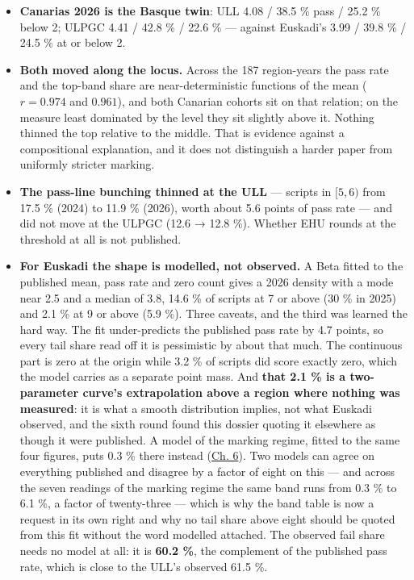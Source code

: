 \documentclass[
  10.5pt,
  a4paper,
  DIV=11,
  numbers=noendperiod]{scrartcl}
\providecommand{\tightlist}{%
  \setlength{\itemsep}{0pt}\setlength{\parskip}{0pt}}
\begin{document}
\begin{itemize}
\tightlist
\item
  \textbf{Canarias 2026 is the Basque twin}: ULL 4.08 / 38.5 \% pass /
  25.2 \% below 2; ULPGC 4.41 / 42.8 \% / 22.6 \% --- against Euskadi's
  3.99 / 39.8 \% / 24.5 \% at or below 2.
\item
  \textbf{Both moved along the locus.} Across the 187 region-years the
  pass rate and the top-band share are near-deterministic functions of
  the mean (\(r = 0.974\) and \(0.961\)), and both Canarian cohorts sit
  on that relation; on the measure least dominated by the level they sit
  slightly above it. Nothing thinned the top relative to the middle.
  That is evidence against a compositional explanation, and it does not
  distinguish a harder paper from uniformly stricter marking.
\item
  \textbf{The pass-line bunching thinned at the ULL} --- scripts in
  \([5,6)\) from 17.5 \% (2024) to 11.9 \% (2026), worth about 5.6
  points of pass rate --- and did not move at the ULPGC (12.6 → 12.8
  \%). Whether EHU rounds at the threshold at all is not published.
\item
  \textbf{For Euskadi the shape is modelled, not observed.} A Beta
  fitted to the published mean, pass rate and zero count gives a 2026
  density with a mode near 2.5 and a median of 3.8, 14.6 \% of scripts
  at 7 or above (30 \% in 2025) and 2.1 \% at 9 or above (5.9 \%). Three
  caveats, and the third was learned the hard way. The fit
  under-predicts the published pass rate by 4.7 points, so every tail
  share read off it is pessimistic by about that much. The continuous
  part is zero at the origin while 3.2 \% of scripts did score exactly
  zero, which the model carries as a separate point mass. And
  \textbf{that 2.1 \% is a two-parameter curve's extrapolation above a
  region where nothing was measured}: it is what a smooth distribution
  implies, not what Euskadi observed, and the sixth round found this
  dossier quoting it elsewhere as though it were published. A model of
  the marking regime, fitted to the same four figures, puts 0.3 \% there
  instead (\href{06-interpretation.qmd\#penalty-shape}{Ch. 6}). Two
  models can agree on everything published and disagree by a factor of
  eight on this --- and across the seven readings of the marking regime
  the same band runs from 0.3 \% to 6.1 \%, a factor of twenty-three ---
  which is why the band table is now a request in its own right and why
  no tail share above eight should be quoted from this fit without the
  word modelled attached. The observed fail share needs no model at all:
  it is \textbf{60.2 \%}, the complement of the published pass rate,
  which is close to the ULL's observed 61.5 \%.
\end{itemize}
\end{document}
